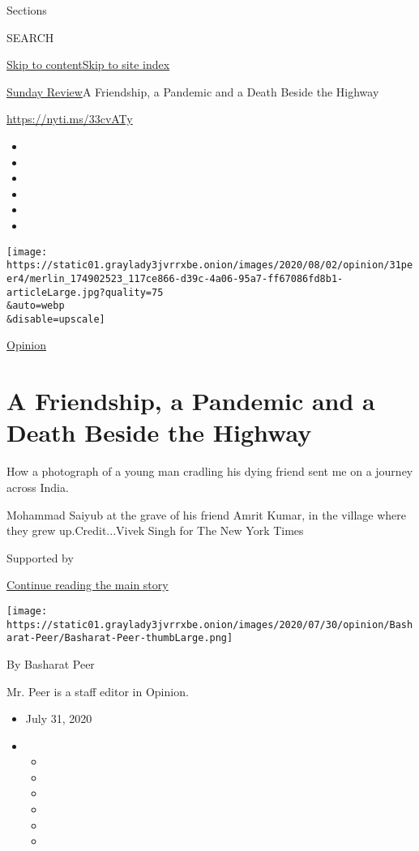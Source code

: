Sections

SEARCH

\protect\hyperlink{site-content}{Skip to
content}\protect\hyperlink{site-index}{Skip to site index}

\href{/section/opinion/sunday}{Sunday Review}\textbar{}A Friendship, a
Pandemic and a Death Beside the Highway

\href{https://nyti.ms/33cvATy}{https://nyti.ms/33cvATy}

\begin{itemize}
\item
\item
\item
\item
\item
\item
\end{itemize}

\texttt{[image: https://static01.graylady3jvrrxbe.onion/images/2020/08/02/opinion/31peer4/merlin\_174902523\_117ce866-d39c-4a06-95a7-ff67086fd8b1-articleLarge.jpg?quality=75\\\&auto=webp\\\&disable=upscale]}

\href{/section/opinion}{Opinion}

\hypertarget{a-friendship-a-pandemic-and-a-death-beside-the-highway}{%
\section{A Friendship, a Pandemic and a Death Beside the
Highway}\label{a-friendship-a-pandemic-and-a-death-beside-the-highway}}

How a photograph of a young man cradling his dying friend sent me on a
journey across India.

Mohammad Saiyub at the grave of his friend Amrit Kumar, in the village
where they grew up.Credit...Vivek Singh for The New York Times

Supported by

\protect\hyperlink{after-sponsor}{Continue reading the main story}

\texttt{[image: https://static01.graylady3jvrrxbe.onion/images/2020/07/30/opinion/Basharat-Peer/Basharat-Peer-thumbLarge.png]}

By Basharat Peer

Mr. Peer is a staff editor in Opinion.

\begin{itemize}
\item
  July 31, 2020
\item
  \begin{itemize}
  \item
  \item
  \item
  \item
  \item
  \item
  \end{itemize}
\end{itemize}


